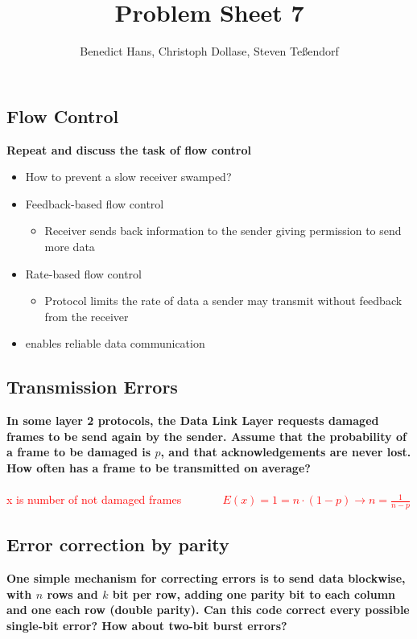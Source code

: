 \documentclass[a4paper,12pt]{article}
\author{Benedict Hans, Christoph Dollase, Steven Te\ss endorf}
\title{ \textbf{Problem Sheet 7}}
\begin{document}
	 
	\maketitle	 %
	
	\subsection{Flow Control}
	\textbf{Repeat and discuss the task of flow control}
	
	\begin{itemize}
		\item How to prevent a slow receiver swamped?
		\item Feedback-based flow control
		\begin{itemize}
			\item Receiver sends back information to the sender giving permission to send more data
		\end{itemize}
		\item Rate-based flow control
		\begin{itemize}
			\item Protocol limits the rate of data a sender may transmit without feedback from the 
			receiver
		\end{itemize}
		\item enables reliable data communication
	\end{itemize}
	
	\subsection{Transmission Errors}
	\textbf{In some layer 2 protocols, the Data Link Layer requests damaged frames to be send again by the sender. Assume that the probability of a frame to be damaged is $p$, and that acknowledgements are never lost.  How often has a frame to be transmitted on average?}\\
	\\
	\textcolor{red}{x is number of not damaged frames ~~~~~~
	$E(x) = 1 = n \cdot (1-p) \rightarrow n = \frac{1}{n-p}$	
	}
	
	
	
	\subsection{Error correction by parity}
	\textbf{One simple mechanism for correcting errors is to send data blockwise, with	$n$ rows and $k$ bit per row, adding one parity bit to each column and one each row (double parity).  Can this code correct every possible single-bit error? How about two-bit burst errors?}
	
\end{document}

